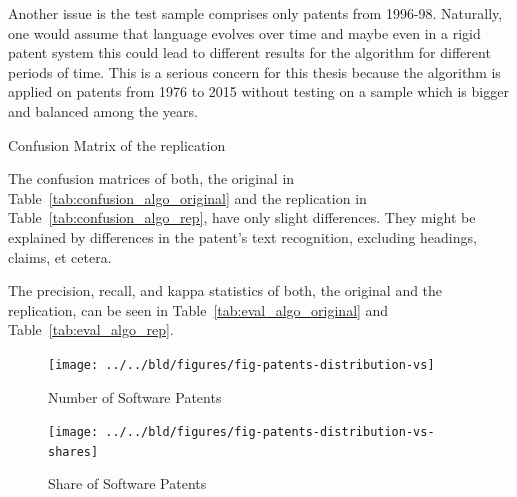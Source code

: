 \documentclass[12pt, a4paper, abstract, parskip]{scrartcl}
\newcommand{\ra}[1]{\renewcommand{\arraystretch}{#1}}
\theoremstyle{definition}
\begin{document}
Another issue is the test sample comprises only patents from 1996-98.
Naturally, one would assume that language evolves over time and maybe even in a
rigid patent system this could lead to different results for the algorithm for
different periods of time. This is a serious concern for this thesis because
the algorithm is applied on patents from 1976 to 2015 without testing on a
sample which is bigger and balanced among the years.

\begin{table}[tb]\caption{Confusion Matrix of the replication}\label{tab:confusion_algo_rep}\centering\ra{1.3}
    
\end{table}

The confusion matrices of both, the original in
Table~\ref{tab:confusion_algo_original} and the replication in
Table~\ref{tab:confusion_algo_rep}, have only slight differences. They might be
explained by differences in the patent's text recognition, excluding headings,
claims, et cetera.

The precision, recall, and kappa statistics of both, the original and the
replication, can be seen in Table~\ref{tab:eval_algo_original} and
Table~\ref{tab:eval_algo_rep}.

\begin{figure}[tb]
	\centering
	\texttt{[image: ../../bld/figures/fig-patents-distribution-vs]}
	\caption{Number of Software Patents}
	\label{fig:softpat}
\end{figure}

\begin{figure}[tb]
	\centering
	\texttt{[image: ../../bld/figures/fig-patents-distribution-vs-shares]}
	\caption{Share of Software Patents}
	\label{fig:sharesoft}
\end{figure}
\end{document}
